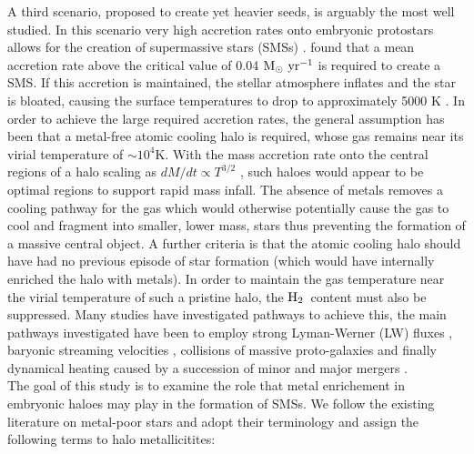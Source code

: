 \documentclass[graphics, twocolumn, usenatbib]{mn2e}
\newcommand{\msolaryr} {$\rm{M_{\odot}~yr^{-1}}~$}
\newcommand{\molH} {$\rm{H_2}$~}
\begin{document}
\indent A third scenario, proposed to create yet heavier seeds, is arguably the most well studied.
In this scenario very high accretion rates onto embryonic protostars allows for the creation of supermassive stars (SMSs)
\citep{Shapiro_1979, Begelman_2008, Schleicher_2013, Hosokawa_2013, Inayoshi_2014, Sakurai_2016,
  Umeda_2016, Haemmerle_2017,Woods_2017, Woods_2018, Regan_2018b}. \cite{Sakurai_2016} found
that a mean accretion rate above the critical value of 0.04 \msolaryr is required to create a SMS.
If this accretion is maintained, the stellar atmosphere inflates and the star is bloated,
causing the surface temperatures to drop to approximately 5000 K \citep{Hosokawa_2013, Woods_2017, Haemmerle_2017}. 
In order to achieve the large required accretion rates, the general assumption has been
that a metal-free atomic cooling halo is required, whose gas remains near its virial temperature of $\sim10^4$K.
With the mass accretion rate onto the central regions of a halo scaling as $dM/dt \propto T^{3/2}$ \citep{Shu_1977}, such haloes would appear
to be optimal regions to support rapid mass infall. The absence of metals removes a cooling pathway for
the gas which would otherwise potentially cause the gas to cool and fragment into smaller, lower
mass, stars thus preventing the formation of a massive central object. A further criteria is that the
atomic cooling halo should have had no previous episode of star formation (which would have
internally enriched the halo with metals). In order to maintain the gas temperature near the virial temperature of such a pristine halo, the \molH content
must also be suppressed. Many studies have investigated pathways to achieve this, the main pathways
investigated have been to employ strong Lyman-Werner (LW) fluxes \citep{Dijkstra_2008, Shang_2010,
  Regan_2014b, Latif_2014b, Agarwal_2015a, Latif_2015, Regan_2016a, Regan_2017, Regan_2018a},
baryonic streaming velocities
\citep{Tseliakhovich_2010, Tanaka_2014, Hirano_2017, Schauer_2017}, collisions of massive
proto-galaxies \citep{Mayer_2010, Mayer_2014, Inayoshi_2015} and finally dynamical heating caused
by a succession of minor and major mergers \citep{Yoshida_2003a, Fernandez_2014, Wise_2019}. \\
\indent The goal of this study is to examine the role that metal enrichement in embryonic haloes may play in the
formation of SMSs. We follow the existing literature on metal-poor stars \citep[e.g.][]{Frebel_2015}
and adopt their terminology and assign the following terms to halo metallicitites:
\end{document}
